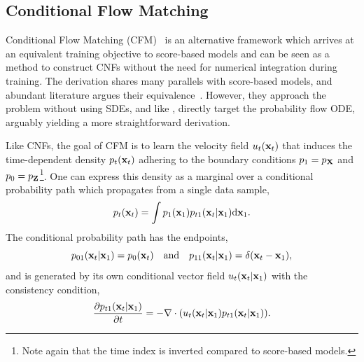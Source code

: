 \subsection{Conditional Flow Matching}
\label{sec:cfm}

Conditional Flow Matching (CFM)~\cite{BuildingNormalizingFlows, FlowMatchingGenerative, FlowStraightFast} is an alternative framework which arrives at an equivalent training objective to score-based models and can be seen as a method to construct CNFs without the need for numerical integration during training.
The derivation shares many parallels with score-based models, and abundant literature argues their equivalence~\cite{CM2, StochasticInterpolants}.
However, they approach the problem without using SDEs, and like \textcite{ElucidatingDesignSpace}, directly target the probability flow ODE, arguably yielding a more straightforward derivation.

Like CNFs, the goal of CFM is to learn the velocity field $u_t(\mathbf{x}_t)$ that induces the time-dependent density $p_t(\mathbf{x}_t)$ adhering to the boundary conditions $p_1 = p_{\mathbf{X}}$ and $p_0 = p_{\mathbf{Z}}$\footnote{Note again that the time index is inverted compared to score-based models.}.
One can express this density as a marginal over a conditional probability path which propagates from a single data sample,
\begin{equation}
    \label{eq:conditional_path}
    p_t(\mathbf{x}_t) = \int p_1(\mathbf{x}_1) p_{t1}(\mathbf{x}_t|\mathbf{x}_1) \mathrm{d} \mathbf{x}_1.
\end{equation}
The conditional probability path has the endpoints,
\begin{equation}
    \label{eq:conditional_path_endpoints}
    p_{01}(\mathbf{x}_t|\mathbf{x}_1) = p_0(\mathbf{x}_t) \quad \text{and} \quad p_{11}(\mathbf{x}_t|\mathbf{x}_1) = \delta(\mathbf{x}_t - \mathbf{x}_1),
\end{equation}
and is generated by its own conditional vector field $u_t(\mathbf{x}_t | \mathbf{x}_1)$ with the consistency condition,
\begin{equation}
    \label{eq:conditional_consistency}
    \frac{\partial p_{t1}(\mathbf{x}_t | \mathbf{x}_1)}{\partial t} = -\nabla \cdot (u_t(\mathbf{x}_t | \mathbf{x}_1) p_{t1}(\mathbf{x}_t | \mathbf{x}_1)).
\end{equation}

